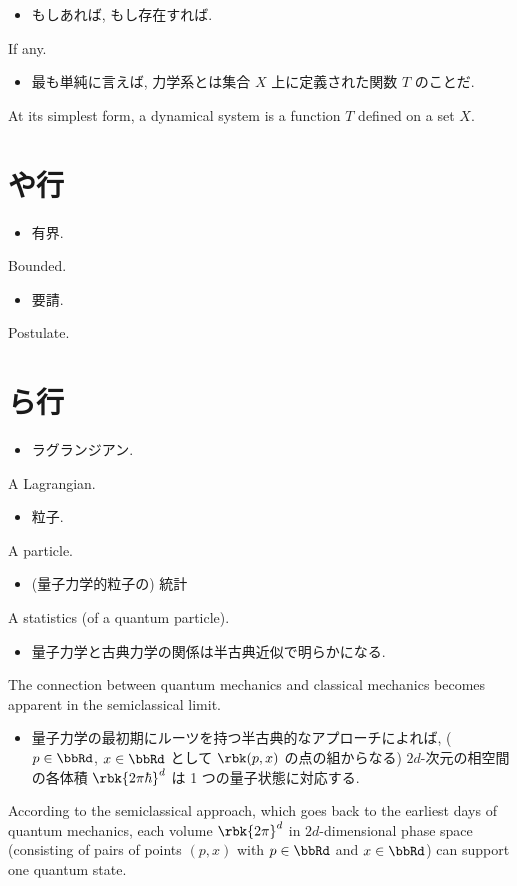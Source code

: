 \documentclass[openany, a4paper, oneside]{jsbook}
\begin{document}
\begin{itemize}
\item もしあれば, もし存在すれば. \cite{LiebSeiringer1}
\end{itemize}
If any.

\begin{itemize}
\item 最も単純に言えば, 力学系とは集合 $X$ 上に定義された関数 $T$ のことだ. \cite{OmriSarig1}
\end{itemize}
At its simplest form, a dynamical system is a function $T$ defined on a set $X$.
\section{や行}

\begin{itemize}
\item 有界.
\end{itemize}
Bounded.

\begin{itemize}
\item 要請.
\end{itemize}
Postulate.
\section{ら行}

\begin{itemize}
\item ラグランジアン.
\end{itemize}
A Lagrangian.

\begin{itemize}
\item 粒子.
\end{itemize}
A particle.

\begin{itemize}
\item (量子力学的粒子の) 統計 \cite{LiebSeiringer1}
\end{itemize}
A statistics (of a quantum particle).

\begin{itemize}
\item 量子力学と古典力学の関係は半古典近似で明らかになる. \cite{LiebSeiringer1}
\end{itemize}
The connection between quantum mechanics and classical mechanics becomes apparent
in the semiclassical limit.

\begin{itemize}
\item 量子力学の最初期にルーツを持つ半古典的なアプローチによれば, ($p \in \bbRd$, $x \in \bbRd$ として $\rbk(p, x)$
  の点の組からなる) $2d$-次元の相空間の各体積 $\rbk{2 \pi \hbar}^d$ は 1 つの量子状態に対応する. \cite{LiebSeiringer1}
\end{itemize}
According to the semiclassical approach, which goes back to the earliest days of quantum mechanics,
each volume $\rbk{2 \pi}^d$ in $2d$-dimensional phase space (consisting of pairs of points
$(p, x)$ with $p \in \bbRd$ and $x \in \bbRd$) can support one quantum state.
\end{document}
